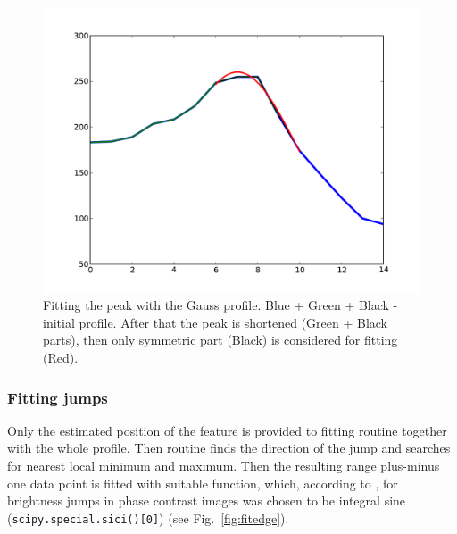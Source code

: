 \documentclass[a4paper,12pt]{article}
\begin{document}
\begin{figure}%
\includegraphics[width=\columnwidth]{figs/fitpeak.pdf}%
\caption{Fitting the peak with the Gauss profile. Blue + Green + Black - initial profile. After that the peak is shortened (Green + Black parts), then only symmetric part (Black) is considered for fitting (Red).}%
\label{fig:fitpeak}%
\end{figure}

\subsubsection{Fitting jumps}\label{fitjump}
Only the estimated position of the feature is provided to fitting routine together with the whole profile. Then routine finds the direction of the jump and searches for nearest local minimum and maximum. Then the resulting range plus-minus one data point is fitted with suitable function, which,  according to \cite{Bitler1999}, for brightness jumps in phase contrast images was chosen to be integral sine (\verb|scipy.special.sici()[0]|) (see Fig.~\ref{fig:fitedge}).
\end{document}
